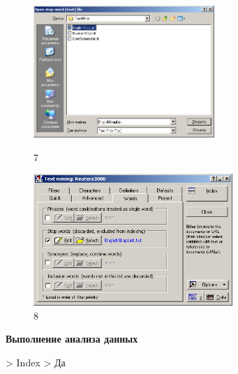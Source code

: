 \begin{figure}[!h]
  \centering

  \begin{minipage}{0.49\textwidth}
    \centering

    \includegraphics[height=5cm]
    {inc/7.PNG}

    \caption{7}

    \label{fig:7}
  \end{minipage}
  \begin{minipage}{0.49\textwidth}
    \centering

    \includegraphics[height=5cm]
    {inc/8.PNG}

    \caption{8}

    \label{fig:8}
  \end{minipage}
\end{figure}

\newpage

\begin{center}
  \textbf{Выполнение анализа данных}
\end{center}

> Index > Да

